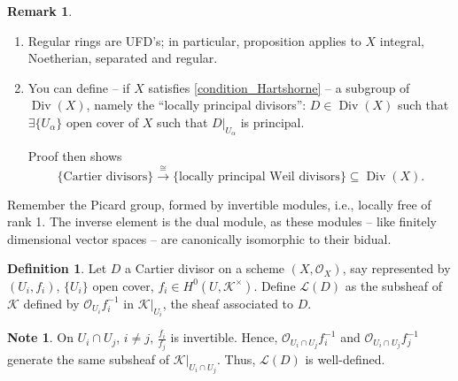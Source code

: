 \documentclass[12pt]{article}
\DeclareMathOperator{\Div}{Div}
\theoremstyle{definition}
\newtheorem*{definition}{Definition}
\newtheorem*{remark}{Remark}
\newtheorem*{note}{Note}
\begin{document}
\begin{remark}
\begin{enumerate}[label=\arabic*)]
\item Regular rings are UFD's; in particular, proposition applies to $X$ integral, Noetherian, separated and regular.

\item You can define -- if $X$ satisfies \eqref{condition_Hartshorne} -- a subgroup of $\Div(X)$, namely the ``locally principal divisors'': $D\in\Div(X)$ such that $\exists\{U_\alpha\}$ open cover of $X$ such that $D|_{U_\alpha}$ is principal.

Proof then shows
\[\{\text{Cartier divisors}\}\overset\cong\longrightarrow\{\text{locally principal Weil divisors}\}\subseteq\Div(X).\]
\end{enumerate}
\end{remark}

Remember the Picard group, formed by invertible modules, i.e., locally free of rank 1. The inverse element is the dual module, as these modules -- like finitely dimensional vector spaces -- are canonically isomorphic to their bidual.

\begin{definition}
Let $D$ a Cartier divisor on a scheme $(X,\mathcal O_X)$, say represented by $(U_i,f_i)$, $\{U_i\}$ open cover, $f_i\in H^0(U,\mathcal K^\times)$. Define $\mathcal L(D)$ as the subsheaf of $\mathcal K$ defined by $\mathcal O_{U_i}f_i^{-1}$ in $\mathcal K|_{U_i}$, the sheaf associated to $D$.
\end{definition}

\begin{note}
On $U_i\cap U_j$, $i\neq j$, $\frac{f_i}{f_j}$ is invertible. Hence, $\mathcal O_{U_i\cap U_j}f_i^{-1}$ and $\mathcal O_{U_i\cap U_j}f_j^{-1}$ generate the same subsheaf of $\mathcal K|_{U_i\cap U_j}$. Thus, $\mathcal L(D)$ is well-defined.
\end{note}
\end{document}
